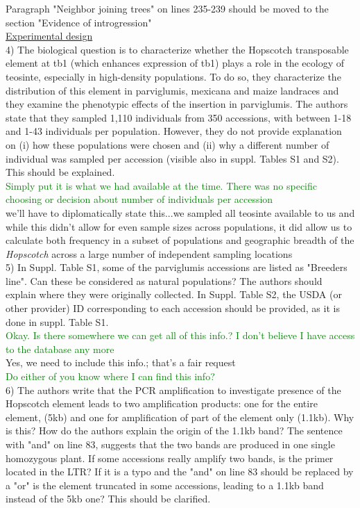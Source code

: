\documentclass[11pt]{article}
\newcommand{\lev}[1]{\noindent \textcolor{green}{{#1}} \\}
\newcommand{\mbh}[1]{\noindent \textcolor{Dandelion}{{#1}}\\}
\begin{document}
Paragraph "Neighbor joining trees" on lines 235-239 should be moved to the section "Evidence of introgression"\\

\underline{Experimental design}\\

4) The biological question is to characterize whether the Hopscotch transposable element at tb1 (which enhances expression of tb1) plays a role in the ecology of teosinte, especially in high-density populations. To do so, they characterize the distribution of this element in parviglumis, mexicana and maize landraces and they examine the phenotypic effects of the insertion in parviglumis.
The authors state that they sampled 1,110 individuals from 350 accessions, with between 1-18 and 1-43 individuals per population. However, they do not provide explanation on (i) how these populations were chosen and (ii) why a different number of individual was sampled per accession (visible also in suppl. Tables S1 and S2). This should be explained.\\

\lev{Simply put it is what we had available at the time. There was no specific choosing or decision about number of individuals per accession}
\mbh{we'll have to diplomatically state this...we sampled all teosinte available to us and while this didn't allow for even sample sizes across populations, it did allow us to calculate both frequency in a subset of populations and geographic breadth of the \emph{Hopscotch} across a large number of independent sampling locations}

5) In Suppl. Table S1, some of the parviglumis accessions are listed as "Breeders line". Can these be considered as natural populations? The authors should explain where they were originally collected. In Suppl. Table S2, the USDA (or other provider) ID corresponding to each accession should be provided, as it is done in suppl. Table S1.\\

\lev{Okay. Is there somewhere we can get all of this info.? I don't believe I have access to the database any more}
\mbh{Yes, we need to include this info.; that's a fair request}
\lev{Do either of you know where I can find this info?}

6) The authors write that the PCR amplification to investigate presence of the Hopscotch element leads to two amplification products: one for the entire element, (5kb) and one for amplification of part of the element only (1.1kb). Why is this? How do the authors explain the origin of the 1.1kb band? The sentence with "and" on line 83, suggests that the two bands are produced in one single homozygous plant. If some accessions really amplify two bands, is the primer located in the LTR? If it is a typo and the "and" on line 83 should be replaced by a "or" is the element truncated in some accessions, leading to a 1.1kb band instead of the 5kb one? This should be clarified.\\
\end{document}
